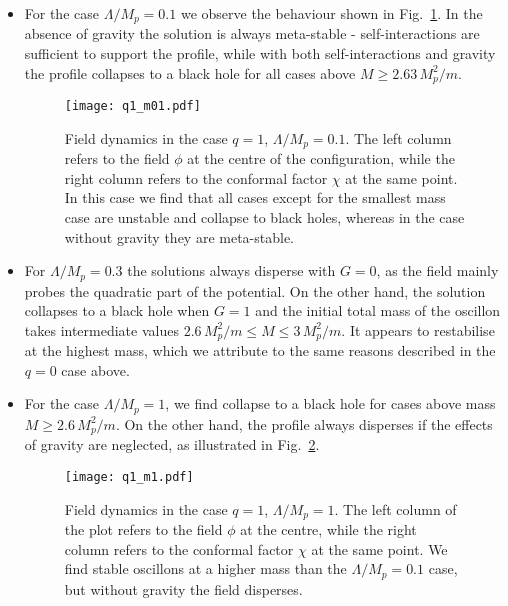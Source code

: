 \documentclass[11pt,a4paper]{article}
\begin{document}
\begin{itemize}
\item For the case $\Lambda/M_p = 0.1$ we observe the behaviour shown in Fig.~\ref{fig:q1Lambda01}. In the absence of gravity the solution is always meta-stable - self-interactions are sufficient to support the profile, while with both self-interactions and gravity the profile collapses to a black hole for all cases above $M \geq 2.63 \, M_p^2/m$.

\begin{figure}[h!]\centering
\texttt{[image: q1\_m01.pdf]}
\caption{Field dynamics in the case $q=1$, $\Lambda/M_p=0.1$. The left column refers to the field $\phi$ at the centre of the configuration, while the right column refers to the conformal factor $\chi$ at the same point. In this case we find that all cases except for the smallest mass case are unstable and collapse to black holes, whereas in the case without gravity they are meta-stable.  \label{fig:q1Lambda01}}
\end{figure}

\item For $\Lambda/M_p = 0.3$ the solutions always disperse with $G=0$, as the field mainly probes the quadratic part of the potential. On the other hand, the solution collapses to a black hole when $G=1$ and the initial total mass of the oscillon takes intermediate values $2.6 \, M_p^2/m \leq M \leq 3 \, M_p^2/m$. It appears to restabilise at the highest mass, which we attribute to the same reasons described in the $q=0$ case above.

\item For the case $\Lambda/M_p = 1$, we find collapse to a black hole for cases above mass $M \geq 2.6 \, M_p^2/m$. On the other hand, the profile always disperses if the effects of gravity are neglected, as illustrated in Fig.~\ref{fig:q1Lambda1}.

\begin{figure}[h!]\centering
\texttt{[image: q1\_m1.pdf]}
\caption{Field dynamics in the case $q=1$, $\Lambda/M_p=1$. The left column of the plot refers to the field $\phi$ at the centre, while the right column refers to the conformal factor $\chi$ at the same point. We find stable oscillons at a higher mass than the $\Lambda/M_p=0.1$ case, but without gravity the field disperses.  \label{fig:q1Lambda1}}
\end{figure}

\end{itemize}
\end{document}
